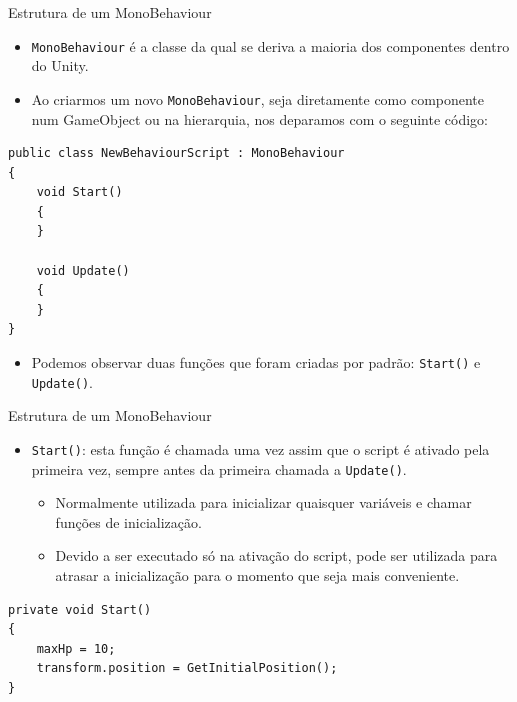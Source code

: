 \documentclass{beamer}
\begin{document}
\begin{frame}[fragile]{Estrutura de um MonoBehaviour}
	\begin{itemize}
		\item \verb|MonoBehaviour| é a classe da qual se deriva a maioria dos componentes dentro do Unity.
		\item Ao criarmos um novo \verb|MonoBehaviour|, seja diretamente como componente num GameObject ou na hierarquia, nos deparamos com o seguinte código:		
	\end{itemize}
	\begin{lstlisting}
public class NewBehaviourScript : MonoBehaviour
{
	void Start()
	{
	}
	
	void Update()
	{	
	}
}	
	\end{lstlisting}
	\begin{itemize}
		\item Podemos observar duas funções que foram criadas por padrão: \verb|Start()| e \verb|Update()|.
	\end{itemize}
\end{frame}

\begin{frame}[fragile]{Estrutura de um MonoBehaviour}
	\begin{itemize}
		\item \verb|Start()|: esta função é chamada uma vez assim que o script é ativado pela primeira vez, sempre antes da primeira chamada a \verb|Update()|.
		\begin{itemize}
			\item Normalmente utilizada para inicializar quaisquer variáveis e chamar funções de inicialização.
			\item Devido a ser executado só na ativação do script, pode ser utilizada para atrasar a inicialização para o momento que seja mais conveniente.
		\end{itemize}
	\end{itemize}
	\begin{lstlisting}
private void Start()
{
	maxHp = 10;
	transform.position = GetInitialPosition();		
}
\end{lstlisting}
\end{frame}
\end{document}
